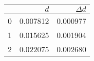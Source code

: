 \begin{tabular}{lrr}
	\toprule
	{} & $d $     & $\Delta d $ \\
	\midrule
	0  & 0.007812 & 0.000977    \\
	1  & 0.015625 & 0.001904    \\
	2  & 0.022075 & 0.002680    \\
	\bottomrule
\end{tabular}

